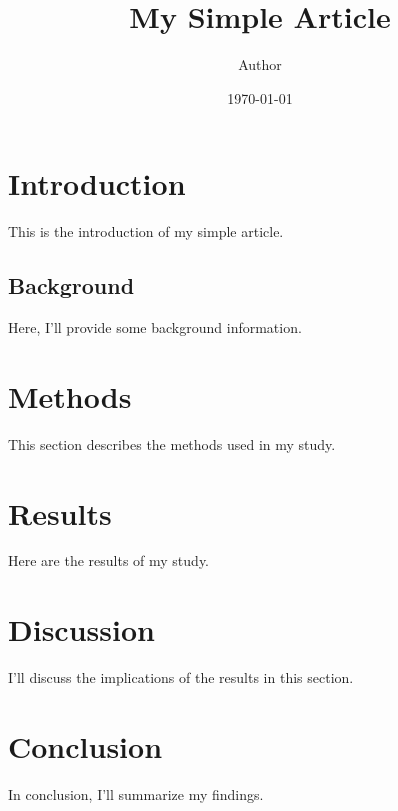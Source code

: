 \documentclass{article}
\title{My Simple Article}
\author{Author}
\date{\today}
\begin{document}
	\maketitle
	\section{Introduction}
		This is the introduction of my simple article.
	\subsection{Background}
	Here, I'll provide some background information.
	\section{Methods}
	This section describes the methods used in my study.
	\section{Results}
	Here are the results of my study.
	\section{Discussion}
	I'll discuss the implications of the results in this section.
	\section{Conclusion}
	In conclusion, I'll summarize my findings.
\end{document}
